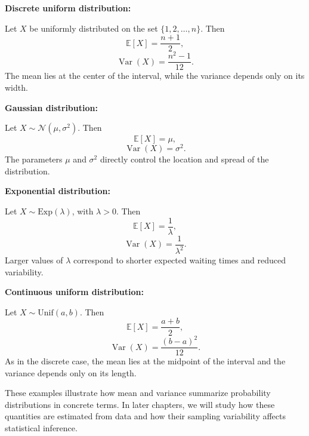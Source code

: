 \medskip

\textbf{Discrete uniform distribution:}

\medskip

Let $X$ be uniformly distributed on the set $\{1,2,\dots,n\}$. Then
\begin{equation}
    \mathbb{E}[X]=\frac{n+1}{2},
\end{equation}
\begin{equation}
    \operatorname{Var}(X)=\frac{n^2-1}{12}.
\end{equation}
The mean lies at the center of the interval, while the variance depends only on its width.

\medskip

\textbf{Gaussian distribution:}

\medskip

Let $X\sim\mathcal{N}(\mu,\sigma^2)$. Then
\begin{equation}
    \mathbb{E}[X]=\mu,
\end{equation}
\begin{equation}
    \operatorname{Var}(X)=\sigma^2.
\end{equation}
The parameters $\mu$ and $\sigma^2$ directly control the location and spread of the distribution.

\medskip

\textbf{Exponential distribution:}

\medskip

Let $X\sim\mathrm{Exp}(\lambda)$, with $\lambda>0$. Then
\begin{equation}
    \mathbb{E}[X]=\frac{1}{\lambda},
\end{equation}
\begin{equation}
    \operatorname{Var}(X)=\frac{1}{\lambda^2}.
\end{equation}
Larger values of $\lambda$ correspond to shorter expected waiting times and reduced variability.

\medskip

\textbf{Continuous uniform distribution:}

\medskip

Let $X\sim\mathrm{Unif}(a,b)$. Then
\begin{equation}
    \mathbb{E}[X]=\frac{a+b}{2},
\end{equation}
\begin{equation}
    \operatorname{Var}(X)=\frac{(b-a)^2}{12}.
\end{equation}
As in the discrete case, the mean lies at the midpoint of the interval and the variance depends only on its length.

\medskip

These examples illustrate how mean and variance summarize probability distributions in concrete terms. In later chapters, we will study how these quantities are estimated from data and how their sampling variability affects statistical inference.
